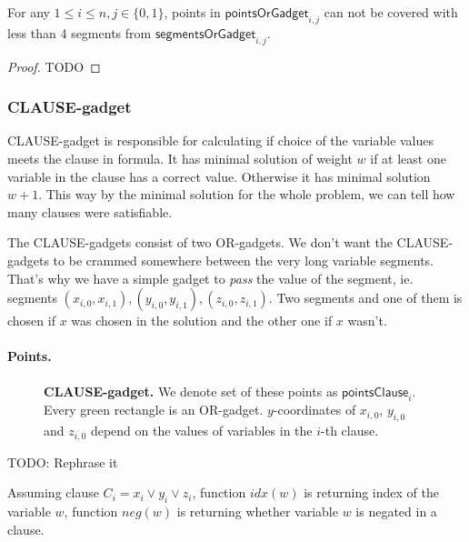 \begin{lemma}
\label{cover_no_less_false}
For any $1 \le i \le n, j \in \{0, 1\}$, points in
$\mathsf{pointsOrGadget}_{i, j}$ can not be covered
with less than 4 segments from $\mathsf{segmentsOrGadget}_{i,j}$.
\end{lemma}

\begin{proof}
TODO
\end{proof}


\subsubsection{CLAUSE-gadget}


CLAUSE-gadget is responsible for calculating if choice of the
variable values meets the clause in formula.
It has minimal solution of weight $w$ if at least one variable
in the clause has a correct value.
Otherwise it has minimal solution $w+1$.
This way by the minimal solution for the whole problem, we can tell
how many clauses were satisfiable.

The CLAUSE-gadgets consist of two OR-gadgets.
We don't want the CLAUSE-gadgets to be crammed 
somewhere between
the very long variable segments. That's why we have a simple
gadget to \textit{pass} the value of the segment, ie. segments
$(x_{i, 0}, x_{i, 1}), (y_{i, 0}, y_{i, 1}), (z_{i, 0}, z_{i, 1})$.
Two segments and one of them is chosen if $x$ was chosen
in the solution and the other one if $x$ wasn't.

\paragraph{Points.}

\newcommand{\pointsClause}{\mathsf{pointsClause}}

\begin{figure}[h]
\centering
\def\svgwidth{0.8\columnwidth}

\caption{\textbf{CLAUSE-gadget.}
We denote set of these points as $\pointsClause_i$.
Every green rectangle is an OR-gadget.
$y$-coordinates of $x_{i, 0}$, $y_{i, 0}$ and $z_{i,0}$
depend on the values of variables in the $i$-th clause.
}
\label{fig:apx_clause}
\end{figure}

TODO: Rephrase it

Assuming clause $C_i = x_i \lor y_i \lor z_i$,
function $idx(w)$ is returning index of the variable $w$,
function $neg(w)$ is returning whether variable $w$ is negated
in a clause.

